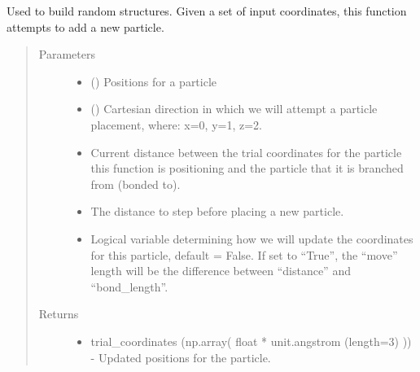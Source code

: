 \documentclass[letterpaper,12pt,english,openany,oneside]{sphinxmanual}
\begin{document}
\begin{fulllineitems}
\label{\detokenize{utilities:utilities.util.get_move}}
Used to build random structures.  Given a set of input coordinates, this function attempts to add a new particle.
\begin{quote}\begin{description}
\item[{Parameters}] \leavevmode\begin{itemize}
\item {} 
 (\sphinxstyleliteralemphasis{\sphinxupquote{( }}\sphinxstyleliteralemphasis{\sphinxupquote{ ( }}\sphinxstyleliteralemphasis{\sphinxupquote{ ) }}\sphinxstyleliteralemphasis{\sphinxupquote{)}}) \textendash{} Positions for a particle

\item {} 
 () \textendash{} Cartesian direction in which we will attempt a particle placement, where: x=0, y=1, z=2.

\item {} 
 \textendash{} Current distance between the trial coordinates for the particle this function is positioning and the particle that it is branched from (bonded to).

\item {} 
 \textendash{} The distance to step before placing a new particle.

\item {} 
 \textendash{} Logical variable determining how we will update the coordinates for this particle, default = False.  If set to “True”, the “move” length will be the difference between “distance” and “bond\_length”.

\end{itemize}

\item[{Returns}] \leavevmode
\begin{itemize}
\item {} 
trial\_coordinates (np.array( float * unit.angstrom (length=3) )) - Updated positions for the particle.

\end{itemize}


\end{description}\end{quote}

\end{fulllineitems}
\end{document}
